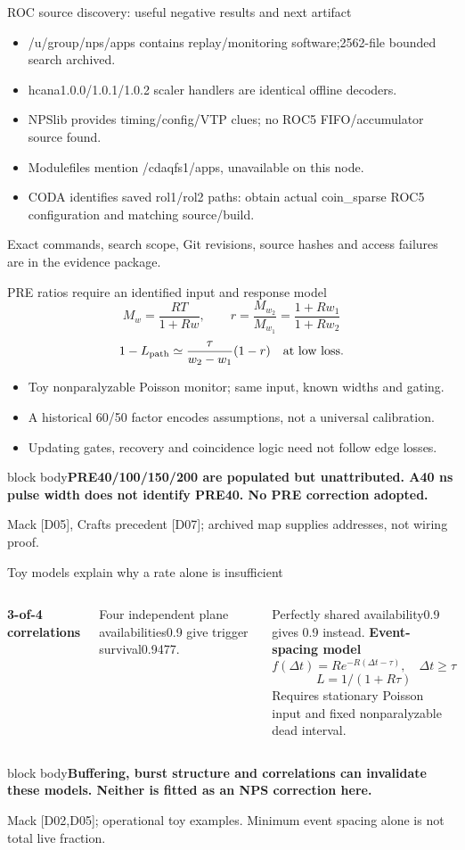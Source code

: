 \documentclass[aspectratio=169,11pt]{beamer}
\newcommand{\source}[1]{\par\vfill{\scriptsize\color{muted}#1\par}}
\newcommand{\takeaway}[1]{\begin{beamercolorbox}[sep=2.5mm,wd=\linewidth]{block body}\textbf{#1}\end{beamercolorbox}}
\begin{document}
\begin{frame}{ROC source discovery: useful negative results and next artifact}
\small\begin{itemize}\setlength\itemsep{3mm}
\item /u/group/nps/apps contains replay/monitoring software;2562-file bounded search archived.
\item hcana1.0.0/1.0.1/1.0.2 scaler handlers are identical offline decoders.
\item NPSlib provides timing/config/VTP clues; no ROC5 FIFO/accumulator source found.
\item Modulefiles mention /cdaqfs1/apps, unavailable on this node.
\item CODA identifies saved rol1/rol2 paths: obtain actual coin\_sparse ROC5 configuration and matching source/build.
\end{itemize}
\source{Exact commands, search scope, Git revisions, source hashes and access failures are in the evidence package.}
\end{frame}

\begin{frame}{PRE ratios require an identified input and response model}
\small\[M_w=\frac{RT}{1+Rw},\qquad r=\frac{M_{w_2}}{M_{w_1}}=\frac{1+Rw_1}{1+Rw_2}\]
\[1-L_{\rm path}\simeq\frac{\tau}{w_2-w_1}(1-r)\quad\text{at low loss}.\]
\begin{itemize}\setlength\itemsep{2mm}
\item Toy nonparalyzable Poisson monitor; same input, known widths and gating.
\item A historical 60/50 factor encodes assumptions, not a universal calibration.
\item Updating gates, recovery and coincidence logic need not follow edge losses.
\end{itemize}\vspace{3mm}
\takeaway{PRE40/100/150/200 are populated but unattributed. A40 ns pulse width does not identify PRE40. No PRE correction adopted.}
\source{Mack [D05], Crafts precedent [D07]; archived map supplies addresses, not wiring proof.}
\end{frame}

\begin{frame}{Toy models explain why a rate alone is insufficient}
\begin{columns}[T]
\textbf{3-of-4 correlations}\small\par
Four independent plane availabilities0.9 give trigger survival0.9477.
\vspace{3mm}\par Perfectly shared availability0.9 gives 0.9 instead.
\textbf{Event-spacing model}\small
\[f(\Delta t)=R e^{-R(\Delta t-\tau)},\quad\Delta t\ge\tau\]
\[L=1/(1+R\tau)\]
Requires stationary Poisson input and fixed nonparalyzable dead interval.
\end{columns}\vspace{5mm}
\takeaway{Buffering, burst structure and correlations can invalidate these models. Neither is fitted as an NPS correction here.}
\source{Mack [D02,D05]; operational toy examples. Minimum event spacing alone is not total live fraction.}
\end{frame}
\end{document}
